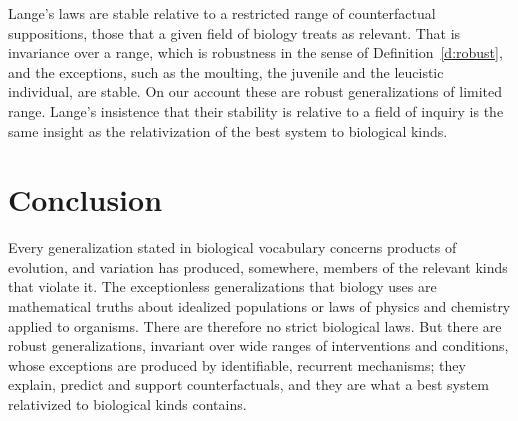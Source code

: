 \documentclass{situationist-preprint}
\begin{document}
\begin{reply}
Lange's laws are stable relative to a restricted range of counterfactual suppositions, those that a given field of biology treats as relevant. That is invariance over a range, which is robustness in the sense of Definition~\ref{d:robust}, and the exceptions, such as the moulting, the juvenile and the leucistic individual, are stable. On our account these are robust generalizations of limited range. Lange's insistence that their stability is relative to a field of inquiry is the same insight as the relativization of the best system to biological kinds.
\end{reply}

\section{Conclusion}\label{s:conclusion}

Every generalization stated in biological vocabulary concerns products of evolution, and variation has produced, somewhere, members of the relevant kinds that violate it. The exceptionless generalizations that biology uses are mathematical truths about idealized populations or laws of physics and chemistry applied to organisms. There are therefore no strict biological laws. But there are robust generalizations, invariant over wide ranges of interventions and conditions, whose exceptions are produced by identifiable, recurrent mechanisms; they explain, predict and support counterfactuals, and they are what a best system relativized to biological kinds contains.
\end{document}
